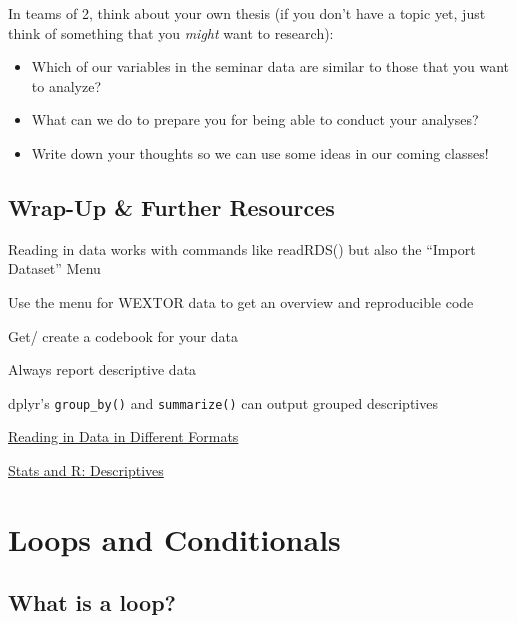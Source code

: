 \documentclass[
]{book}
\providecommand{\tightlist}{%
  \setlength{\itemsep}{0pt}\setlength{\parskip}{0pt}}
\begin{document}
In teams of 2, think about your own thesis (if you don't have a topic yet, just think of something that you \emph{might} want to research):

\begin{itemize}
\tightlist
\item
  Which of our variables in the seminar data are similar to those that you want to analyze?
\item
  What can we do to prepare you for being able to conduct your analyses?
\item
  Write down your thoughts so we can use some ideas in our coming classes!
\end{itemize}

\section{Wrap-Up \& Further Resources}\label{wrap-up-further-resources-3}

Reading in data works with commands like readRDS() but also the ``Import Dataset'' Menu

Use the menu for WEXTOR data to get an overview and reproducible code

Get/ create a codebook for your data

Always report descriptive data

dplyr's \texttt{group\_by()} and \texttt{summarize()} can output grouped descriptives

\href{https://www.datafiles.samhsa.gov/get-help/format-specific-issues/how-do-i-read-data-r}{Reading in Data in Different Formats}

\href{https://statsandr.com/blog/descriptive-statistics-in-r/}{Stats and R: Descriptives}

\chapter{Loops and Conditionals}\label{loops-and-conditionals}

\section{What is a loop?}\label{what-is-a-loop}
\end{document}
